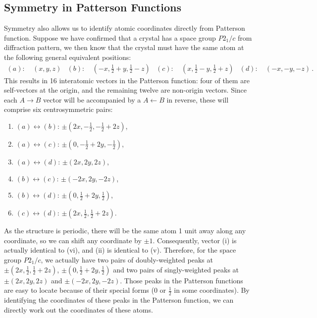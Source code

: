 \documentclass{article}
\theoremstyle{plain}\theoremheaderfont{\normalfont\itshape}\theorembodyfont{\rmfamily}\theoremseparator{.}\newtheorem*{rem}{Remark}\newtheorem*{ex}{Example}\newtheorem*{proof}{Proof}\newtheorem*{altp}{Alternative proof}
\theoremstyle{plain}\theoremheaderfont{\normalfont\bfseries}\theorembodyfont{\rmfamily}\theoremseparator{.}\newtheorem{thm}{Theorem}[section]\newtheorem{lem}[thm]{Lemma}\newtheorem{prop}[thm]{Proposition}\newtheorem*{cor}{Corollary}\newtheorem{defn}[thm]{Definition}\newtheorem{clm}[thm]{Claim}\newtheorem{clminproof}{Claim}\newtheorem*{law}{Law}\newtheorem{pos}[thm]{Postulate}
\theoremstyle{break}\theoremheaderfont{\normalfont\itshape}\theorembodyfont{\rmfamily}\theoremseparator{.\medskip}\newtheorem*{proofskip}{Proof}\newtheorem*{exs}{Examples}\newtheorem*{rems}{Remarks}
\theoremstyle{break}\theoremheaderfont{\normalfont\bfseries}\theorembodyfont{\rmfamily}\theoremseparator{.\medskip}\newtheorem{lemskip}[thm]{Lemma}\newtheorem{defnskip}[thm]{Definition}\newtheorem{propskip}[thm]{Proposition}\newtheorem{thmskip}[thm]{Theorem}
\numberwithin{equation}{section}
\begin{document}
    \subsection{Symmetry in Patterson Functions}
    Symmetry also allows us to identify atomic coordinates directly from Patterson function. Suppose we have confirmed that a crystal has a space group \(P2_1/c\) from diffraction pattern, we then know that the crystal must have the same atom at the following general equivalent positions:
    \begin{align*}
        (a):&\ (x,y,z) & (b):&\ \textstyle (-x,\frac{1}{2}+y,\frac{1}{2}-z) & (c):&\ \textstyle (x,\frac{1}{2}-y,\frac{1}{2}+z) & (d):&\ (-x,-y,-z)\,.
    \end{align*}
    This results in 16 interatomic vectors in the Patterson function: four of them are self-vectors at the origin, and the remaining twelve are non-origin vectors. Since each \(A\to B\) vector will be accompanied by a \(A\leftarrow B\) in reverse, these will comprise six centrosymmetric pairs:
    \begin{enumerate}[topsep=0pt,label=(\roman*)]
        \item \((a)\leftrightarrow (b)\): \(\pm (2x,-\frac{1}{2},-\frac{1}{2}+2z)\),
        \item \((a)\leftrightarrow (c)\): \(\pm (0,-\frac{1}{2}+2y,-\frac{1}{2})\),
        \item \((a)\leftrightarrow (d)\): \(\pm (2x,2y,2z)\),
        \item \((b)\leftrightarrow (c)\): \(\pm (-2x,2y,-2z)\),
        \item \((b)\leftrightarrow (d)\): \(\pm (0,\frac{1}{2}+2y,\frac{1}{2})\),
        \item \((c)\leftrightarrow (d)\): \(\pm (2x,\frac{1}{2},\frac{1}{2}+2z)\).
    \end{enumerate}
    As the structure is periodic, there will be the same atom 1 unit away along any coordinate, so we can shift any coordinate by \(\pm 1\). Consequently, vector (i) is actually identical to (vi), and (ii) is identical to (v). Therefore, for the space group \(P2_1/c\), we actually have two pairs of doubly-weighted peaks at \(\pm (2x,\frac{1}{2},\frac{1}{2}+2z)\), \(\pm (0,\frac{1}{2}+2y,\frac{1}{2})\) and two pairs of singly-weighted peaks at \(\pm(2x,2y,2z)\) and \(\pm(-2x,2y,-2z)\). Those peaks in the Patterson functions are easy to locate because of their special forms (0 or \(\frac{1}{2}\) in some coordinates). By identifying the coordinates of these peaks in the Patterson function, we can directly work out the coordinates of these atoms.
\end{document}
